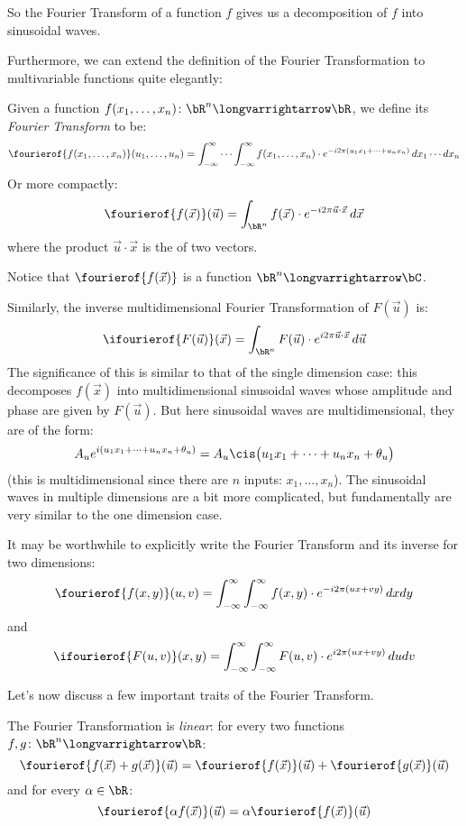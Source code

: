 \documentclass[10pt]{article}
\begin{document}
So the Fourier Transform of a function $f$ gives us a decomposition of $f$ into sinusoidal waves.

Furthermore, we can extend the definition of the Fourier Transformation to multivariable functions quite elegantly:

\newpage
\begin{defn*}

    Given a function $f(x_1,\dots,x_n)\colon\bR^n\longvarrightarrow\bR$, we define its \emph{Fourier Transform} to be:
    \[ \fourierof{f(x_1,\dots,x_n)}(u_1,\dots,u_n) = \int_{-\infty}^\infty\cdots\int_{-\infty}^\infty f(x_1,\dots,x_n)\cdot e^{-i2\pi(u_1x_1+\cdots+u_nx_n)}\,dx_1\cdots dx_n \]
    Or more compactly:
    \[ \fourierof{f(\vec x)}(\vec u) = \int_{\bR^n} f(\vec x)\cdot e^{-i2\pi \vec u\cdot\vec x}\,d\vec x \]
    where the product $\vec u\cdot\vec x$ is the  of two vectors.

    Notice that $\fourierof{f(\vec x)}$ is a function $\bR^n\longvarrightarrow\bC$.

\end{defn*}

Similarly, the inverse multidimensional Fourier Transformation of $F(\vec u)$ is:
\[ \ifourierof{F(\vec u)}(\vec x) = \int_{\bR^n} F(\vec u)\cdot e^{i2\pi\vec u\cdot\vec x}\,d\vec u \]
The significance of this is similar to that of the single dimension case: this decomposes $f(\vec x)$ into multidimensional sinusoidal waves whose amplitude and phase are given by $F(\vec u)$.
But here sinusoidal waves are multidimensional, they are of the form:
\[ A_u e^{i(u_1x_1+\cdots+u_nx_n+\theta_u)} = A_u\cis\bigl(u_1x_1+\cdots+u_nx_n+\theta_u\bigr) \]
(this is multidimensional since there are $n$ inputs: $x_1,\dots,x_n$).
The sinusoidal waves in multiple dimensions are a bit more complicated, but fundamentally are very similar to the one dimension case.

It may be worthwhile to explicitly write the Fourier Transform and its inverse for two dimensions:
\[ \fourierof{f(x,y)}(u,v) = \int_{-\infty}^\infty\int_{-\infty}^\infty f(x,y)\cdot e^{-i2\pi(ux+vy)}\,dxdy \]
and
\[ \ifourierof{F(u,v)}(x,y) = \int_{-\infty}^\infty\int_{-\infty}^\infty F(u,v)\cdot e^{i2\pi(ux+vy)}\,dudv \]

Let's now discuss a few important traits of the Fourier Transform.

\benum
    \item The Fourier Transformation is \emph{linear}: for every two functions $f,g\colon\bR^n\longvarrightarrow\bR$:
    \[ \fourierof{f(\vec x) + g(\vec x)}(\vec u) = \fourierof{f(\vec x)}(\vec u) + \fourierof{g(\vec x)}(\vec u) \]
    and for every $\alpha\in\bR$:
    \[ \fourierof{\alpha f(\vec x)}(\vec u) = \alpha\fourierof{f(\vec x)}(\vec u) \]
\end{document}
